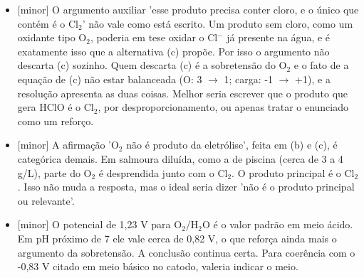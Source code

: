 \documentclass{article}%
\begin{document}
\begin{itemize}%
\item%
{[}minor{]} O argumento auxiliar 'esse produto precisa conter cloro, e o único que contém é o Cl$_{2}$' não vale como está escrito. Um produto sem cloro, como um oxidante tipo O$_{2}$, poderia em tese oxidar o Cl$^{-}$ já presente na água, e é exatamente isso que a alternativa (c) propõe. Por isso o argumento não descarta (c) sozinho. Quem descarta (c) é a sobretensão do O$_{2}$ e o fato de a equação de (c) não estar balanceada (O: 3 $\to$ 1; carga: -1 $\to$ +1), e a resolução apresenta as duas coisas. Melhor seria escrever que o produto que gera HClO é o Cl$_{2}$, por desproporcionamento, ou apenas tratar o enunciado como um reforço.%
\item%
{[}minor{]} A afirmação 'O$_{2}$ não é produto da eletrólise', feita em (b) e (c), é categórica demais. Em salmoura diluída, como a de piscina (cerca de 3 a 4 g/L), parte do O$_{2}$ é desprendida junto com o Cl$_{2}$. O produto principal é o Cl$_{2}$. Isso não muda a resposta, mas o ideal seria dizer 'não é o produto principal ou relevante'.%
\item%
{[}minor{]} O potencial de 1,23 V para O$_{2}$/H$_{2}$O é o valor padrão em meio ácido. Em pH próximo de 7 ele vale cerca de 0,82 V, o que reforça ainda mais o argumento da sobretensão. A conclusão continua certa. Para coerência com o -0,83 V citado em meio básico no catodo, valeria indicar o meio.%
\end{itemize}%
\end{document}
